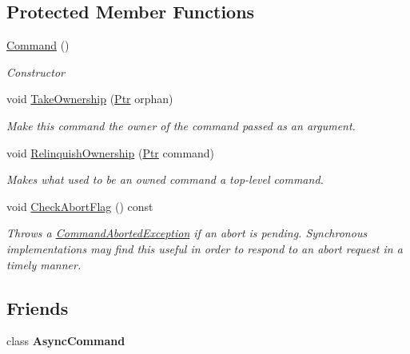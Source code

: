 \subsection*{Protected Member Functions}
\begin{DoxyCompactItemize}
\item 
\mbox{\hyperlink{class_command_lib_1_1_command_a31713edf2ee9c217f9090e5337dd1f44}{Command}} ()
\begin{DoxyCompactList}\small\item\em Constructor \end{DoxyCompactList}\item 
void \mbox{\hyperlink{class_command_lib_1_1_command_a0787e7b79c5424926be5c1c8be1ebb0d}{Take\+Ownership}} (\mbox{\hyperlink{class_command_lib_1_1_command_a3b3e4f00144373299df5c6bb1acc319d}{Ptr}} orphan)
\begin{DoxyCompactList}\small\item\em Make this command the owner of the command passed as an argument.\end{DoxyCompactList}\item 
void \mbox{\hyperlink{class_command_lib_1_1_command_ac872e76c74ed573668b60351fd9ffd1d}{Relinquish\+Ownership}} (\mbox{\hyperlink{class_command_lib_1_1_command_a3b3e4f00144373299df5c6bb1acc319d}{Ptr}} command)
\begin{DoxyCompactList}\small\item\em Makes what used to be an owned command a top-\/level command.\end{DoxyCompactList}\item 
void \mbox{\hyperlink{class_command_lib_1_1_command_a0e9fe77b6976159e86428ebcaeee0e82}{Check\+Abort\+Flag}} () const
\begin{DoxyCompactList}\small\item\em Throws a \mbox{\hyperlink{class_command_lib_1_1_command_aborted_exception}{Command\+Aborted\+Exception}} if an abort is pending. Synchronous implementations may find this useful in order to respond to an abort request in a timely manner. \end{DoxyCompactList}\end{DoxyCompactItemize}
\subsection*{Friends}
\begin{DoxyCompactItemize}
\item 
\mbox{\label{class_command_lib_1_1_command_abff6f12669682d683b4c150859ce09fc}} 
class {\bfseries Async\+Command}
\end{DoxyCompactItemize}


